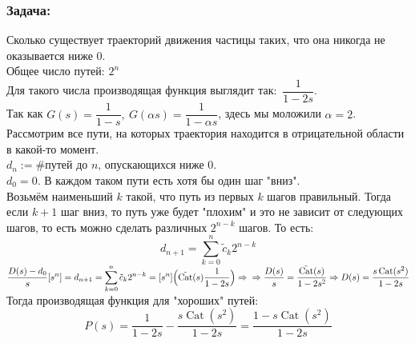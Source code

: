 \documentclass[12pt, letterpaper, twoside]{article}
\newcommand{\DS}{\displaystyle}
\begin{document}
    \subsubsection*{Задача:}
    Сколько существует траекторий движения частицы таких, что она никогда не оказывается ниже $0$.\\
    Общее число путей: $2^n$\\
    Для такого числа производящая функция выглядит так:\ $\dfrac{1}{1 - 2s}$.\\
    Так как $G(s) = \dfrac{1}{1 - s},\ G(\alpha s) = \dfrac{1}{1 - \alpha s}$, здесь мы моложили $\alpha = 2$.\\
    Рассмотрим все пути, на которых траектория находится в отрицательной области в какой-то момент.\\
    $d_n := \#\text{путей до $n$, опускающихся ниже $0$}$.\\
    $d_0 = 0$. В каждом таком пути есть хотя бы один шаг "вниз".\\
    Возьмём наименьший $k$ такой, что путь из первых $k$ шагов правильный. Тогда если $k + 1$ шаг вниз, то путь уже будет "плохим" и это не зависит от следующих шагов, то есть можно сделать различных $2^{n - k}$ шагов. То есть:
    \[d_{n + 1} = \sum_{k = 0}^{n} \tilde{c}_k 2^{n - k}\]
    $\DS\frac{D(s) - d_0}{s}[s^n] = d_{n + 1} = \sum_{k = 0}^{n} \tilde{c}_k 2^{n - k} = [s^n]\Big(\tilde{\operatorname{Cat}}(s) \frac{1}{1 - 2s} \Big)\Rightarrow\\
    \Rightarrow \frac{D(s)}{s} = \frac{\tilde{ \operatorname{Cat} }(s) }{1 - 2s^2}\Rightarrow D(s) = \frac{s\operatorname{Cat}(s^2)}{1 - 2s}$\\
    Тогда производящая функция для "хороших" путей:
    \[P(s) = \frac{1}{1 - 2s} - \frac{s\operatorname{Cat}(s^2)}{1 - 2s} = \frac{1 - s\operatorname{Cat}(s^2)}{1 - 2s} \]
\end{document}
